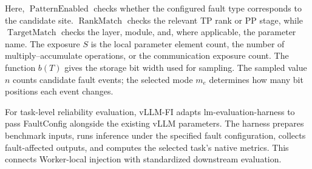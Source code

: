 \begin{algorithm}[t]
\footnotesize
\DontPrintSemicolon
\SetAlgoVlined
\SetInd{0.35em}{0.75em}

\caption{Fault Injection in vLLM-FI}
\label{alg:vllmfi-injection}


\end{algorithm}

Here, $\operatorname{PatternEnabled}$ checks whether the configured fault type corresponds to the candidate site. $\operatorname{RankMatch}$ checks the relevant TP rank or PP stage, while $\operatorname{TargetMatch}$ checks the layer, module, and, where applicable, the parameter name. The exposure $S$ is the local parameter element count, the number of multiply--accumulate operations, or the communication exposure count. The function $b(T)$ gives the storage bit width used for sampling. The sampled value $n$ counts candidate fault events; the selected mode $m_e$ determines how many bit positions each event changes.

For task-level reliability evaluation, vLLM-FI adapts lm-evaluation-harness to pass FaultConfig alongside the existing vLLM parameters. The harness prepares benchmark inputs, runs inference under the specified fault configuration, collects fault-affected outputs, and computes the selected task's native metrics. This connects Worker-local injection with standardized downstream evaluation.




